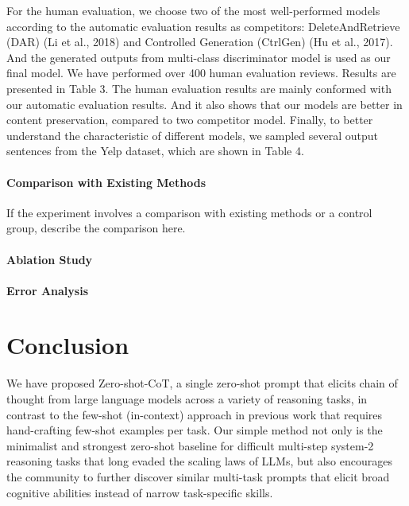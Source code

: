 \documentclass{article}
\begin{document}
For the human evaluation, we choose two of the most well-performed models according to the automatic evaluation results as competitors: DeleteAndRetrieve (DAR) (Li et al., 2018) and Controlled Generation (CtrlGen) (Hu et al., 2017). And the generated outputs from multi-class discriminator model is used as our final model. We have performed over 400 human evaluation reviews. Results are presented in Table 3. The human evaluation results are mainly conformed with our automatic evaluation results. And it also shows that our models are better in content preservation, compared to two competitor model. Finally, to better understand the characteristic of different models, we sampled several output sentences from the Yelp dataset, which are shown in Table 4.

\paragraph{Comparison with Existing Methods}
If the experiment involves a comparison with existing methods or a control group, describe the comparison here.

\paragraph{Ablation Study}

\paragraph{Error Analysis}

\section{Conclusion}
We have proposed Zero-shot-CoT, a single zero-shot prompt that elicits chain of thought from large
language models across a variety of reasoning tasks, in contrast to the few-shot (in-context) approach
in previous work that requires hand-crafting few-shot examples per task. Our simple method not only
is the minimalist and strongest zero-shot baseline for difficult multi-step system-2 reasoning tasks
that long evaded the scaling laws of LLMs, but also encourages the community to further discover
similar multi-task prompts that elicit broad cognitive abilities instead of narrow task-specific skills.
\end{document}
